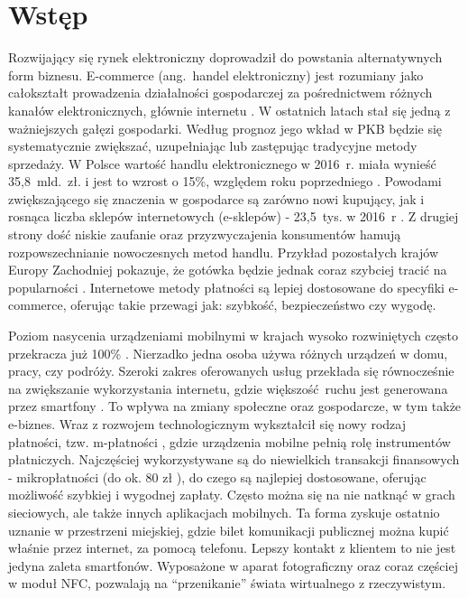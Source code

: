 \section*{Wstęp}

Rozwijający się rynek elektroniczny doprowadził do powstania alternatywnych form biznesu. E-commerce (ang.~handel elektroniczny) \cite{biblia_ebiznesu} jest rozumiany jako całokształt prowadzenia działalności gospodarczej za pośrednictwem różnych kanałów elektronicznych, głównie internetu \cite{pieniadz_elektroniczny-analiza}. W ostatnich latach stał się jedną z ważniejszych gałęzi gospodarki. Według prognoz jego wkład w PKB będzie się systematycznie zwiększać, uzupełniając lub zastępując tradycyjne metody sprzedaży. W Polsce wartość handlu elektronicznego w 2016~r. miała wynieść 35,8~mld.~zł. i jest to wzrost o 15\%, względem roku poprzedniego \cite{barometr_radio}. Powodami zwiększającego się znaczenia w gospodarce są zarówno nowi kupujący, jak i rosnąca liczba sklepów internetowych (e-sklepów) - 23,5~tys. w 2016~r \cite{barometr_radio}. Z drugiej strony dość niskie zaufanie oraz przyzwyczajenia konsumentów hamują rozpowszechnianie nowoczesnych metod handlu. Przykład pozostałych krajów Europy Zachodniej pokazuje, że gotówka będzie jednak coraz szybciej tracić na popularności \cite{pieniadz_elektroniczny-analiza}. Internetowe metody płatności są lepiej dostosowane do specyfiki e-commerce, oferując takie przewagi jak: szybkość, bezpieczeństwo czy wygodę.

Poziom nasycenia urządzeniami mobilnymi w krajach wysoko rozwiniętych często przekracza już 100\% \cite{biblia_ebiznesu}. Nierzadko jedna osoba używa różnych urządzeń w domu, pracy, czy podróży. Szeroki zakres oferowanych usług przekłada się równocześnie na zwiększanie wykorzystania internetu, gdzie większość ruchu jest generowana przez smartfony \cite{ruch_mobilny-internet}. To wpływa na zmiany społeczne oraz gospodarcze, w tym także e-biznes. Wraz z rozwojem technologicznym wykształcił się nowy rodzaj płatności, tzw. m-płatności \cite{biblia_ebiznesu}, gdzie urządzenia mobilne pełnią rolę instrumentów płatniczych. Najczęściej wykorzystywane są do niewielkich transakcji finansowych - mikropłatności (do ok. 80 zł \cite{elektroniczne_metody_platnosci}), do czego są najlepiej dostosowane, oferując możliwość szybkiej i wygodnej zapłaty. Często można się na nie natknąć w grach sieciowych, ale także innych aplikacjach mobilnych. Ta forma zyskuje ostatnio uznanie w przestrzeni miejskiej, gdzie bilet komunikacji publicznej można kupić właśnie przez internet, za pomocą telefonu. Lepszy kontakt z klientem to nie jest jedyna zaleta smartfonów. Wyposażone w aparat fotograficzny oraz coraz częściej w moduł NFC, pozwalają na ``przenikanie'' świata wirtualnego z rzeczywistym. 

